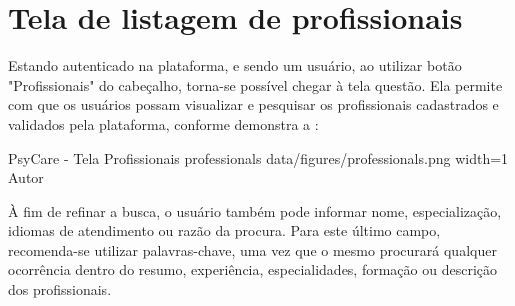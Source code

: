 \section{Tela de listagem de profissionais}
\label{sec:profissionais}

Estando autenticado na plataforma, e sendo um usuário, ao utilizar botão "Profissionais" do cabeçalho, torna-se possível chegar à tela questão. Ela permite com que os usuários possam visualizar e pesquisar os profissionais cadastrados e validados pela plataforma, conforme demonstra a :

\image
    {PsyCare - Tela Profissionais}
    {professionals}
    {data/figures/professionals.png}
    {width=1\textwidth}
    {Autor}

À fim de refinar a busca, o usuário também pode informar nome, especialização, idiomas de atendimento ou razão da procura. Para este último campo, recomenda-se utilizar palavras-chave, uma vez que o mesmo procurará qualquer ocorrência dentro do resumo, experiência, especialidades, formação ou descrição dos profissionais.
